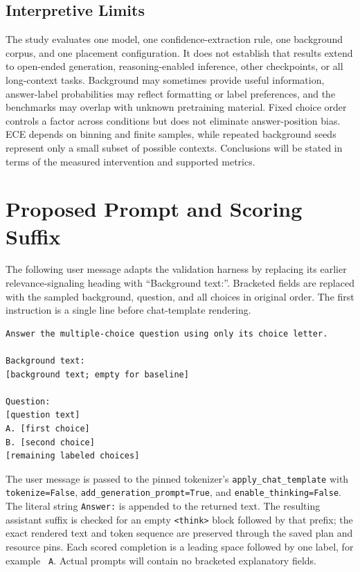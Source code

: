 \documentclass[conference]{IEEEtran}
\begin{document}
\subsection{Interpretive Limits}
The study evaluates one model, one confidence-extraction rule, one background corpus, and one placement configuration. It does not establish that results extend to open-ended generation, reasoning-enabled inference, other checkpoints, or all long-context tasks. Background may sometimes provide useful information, answer-label probabilities may reflect formatting or label preferences, and the benchmarks may overlap with unknown pretraining material. Fixed choice order controls a factor across conditions but does not eliminate answer-position bias. ECE depends on binning and finite samples, while repeated background seeds represent only a small subset of possible contexts. Conclusions will be stated in terms of the measured intervention and supported metrics.

\appendices
\section{Proposed Prompt and Scoring Suffix}
\label{app:prompt}
The following user message adapts the validation harness by replacing its earlier relevance-signaling heading with ``Background text:''. Bracketed fields are replaced with the sampled background, question, and all choices in original order. The first instruction is a single line before chat-template rendering.
\begin{lstlisting}
Answer the multiple-choice question using only its choice letter.

Background text:
[background text; empty for baseline]

Question:
[question text]
A. [first choice]
B. [second choice]
[remaining labeled choices]
\end{lstlisting}
The user message is passed to the pinned tokenizer's \texttt{apply\_chat\_template} with \texttt{tokenize=False}, \texttt{add\_generation\_prompt=True}, and \texttt{enable\_thinking=False}. The literal string \texttt{Answer:} is appended to the returned text. The resulting assistant suffix is checked for an empty \texttt{<think>} block followed by that prefix; the exact rendered text and token sequence are preserved through the saved plan and resource pins. Each scored completion is a leading space followed by one label, for example \texttt{ A}. Actual prompts will contain no bracketed explanatory fields.
\end{document}
